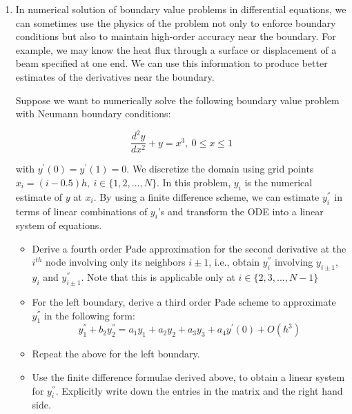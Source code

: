 \documentclass{article}
\begin{document}
\begin{enumerate}
\item In numerical solution of boundary value problems in differential equations, we can
sometimes use the physics of the problem not only to enforce boundary conditions but also
to maintain high-order accuracy near the boundary. For example, we may know the heat flux
through a surface or displacement of a beam specified at one end. We can use this
information to produce better estimates of the derivatives near the boundary.

Suppose we want to numerically solve the following boundary value problem with Neumann
boundary conditions:

\begin{equation*}
    \frac{d^{2} y}{dx^{2}} + y = x^{3}, \ 0 \leq x \leq 1
\end{equation*}

with $y^{'}(0) = y^{'}(1) = 0$. We discretize the domain using grid points $x_{i} = 
(i - 0.5)h, \ i \in \{1,2,...,N\}$. In this problem, $y_{i}$ is the numerical estimate of 
$y$ at $x_{i}$. By using a finite difference scheme, we can estimate $y_{i}^{''}$ in terms 
of linear combinations of $y_{i}$'s and transform the ODE into a linear system of equations.

\begin{itemize}

    \item Derive a fourth order Pade approximation for the second derivative at the
        $i^{th}$ node involving only its neighbors $i \pm 1$, i.e., obtain $y_{i}^{''}$
        involving $y_{i \pm 1}$, $y_{i}$ and $y_{i \pm 1}^{''}$. Note that this is
        applicable only at $i \in \{2,3,...,N-1\}$

    \item For the left boundary, derive a third order Pade scheme to approximate
        $y_{1}^{''}$ in the following form:
        \begin{equation*}
            y_{1}^{''} + b_{2} y_{2}^{''} = a_{1}y_{1} + a_{2}y_{2} + a_{3}y_{3} +
            a_{4}y^{'}(0) + O(h^{3})
        \end{equation*}

    \item Repeat the above for the left boundary.

    \item Use the finite difference formulae derived above, to obtain a linear system for
        $y_{i}^{''}$. Explicitly write down the entries in the matrix and the right hand
        side.


\end{itemize}
\end{enumerate}
\end{document}
